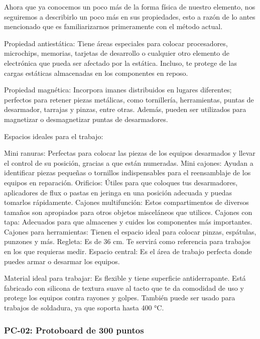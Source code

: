     Ahora que ya conocemos un poco más de la forma física de nuestro elemento, nos seguiremos a describirlo un poco más en sus propiedades, esto a razón de lo antes mencionado que es familiarizarnos primeramente con el método actual.
    
    Propiedad antiestática: Tiene áreas especiales para colocar procesadores, microchips, memorias, tarjetas de desarrollo o cualquier otro elemento de electrónica que pueda ser afectado por la estática. Incluso, te protege de las cargas estáticas almacenadas en los componentes en reposo.
    
    
    Propiedad magnética: Incorpora imanes distribuidos en lugares diferentes; perfectos para retener piezas metálicas, como tornillería, herramientas, puntas de desarmador, tarrajas y pinzas, entre otras. Además, pueden ser utilizados para magnetizar o desmagnetizar puntas de desarmadores.
    
    
    Espacios ideales para el trabajo:
    
    Mini ranuras: Perfectas para colocar las piezas de los equipos desarmados y llevar el control de su posición, gracias a que están numeradas.
    Mini cajones: Ayudan a identificar piezas pequeñas o tornillos indispensables para el reensamblaje de los equipos en reparación.
    Orificios: Útiles para que coloques tus desarmadores, aplicadores de flux o pastas en jeringa en una posición adecuada y puedas tomarlos rápidamente.
    Cajones multifunción: Estos compartimentos de diversos tamaños son apropiados para otros objetos misceláneos que utilices.
    Cajones con tapa: Adecuados para que almacenes y cuides los componentes más importantes.
    Cajones para herramientas: Tienen el espacio ideal para colocar pinzas, espátulas, punzones y más.
    Regleta: Es de 36 cm. Te servirá como referencia para trabajos en los que requieras medir.
    Espacio central: Es el área de trabajo perfecta donde puedes armar o desarmar los equipos.
    
    Material ideal para trabajar: Es flexible y tiene superficie antiderrapante. Está fabricado con silicona de textura suave al tacto que te da comodidad de uso y protege los equipos contra rayones y golpes. También puede ser usado para trabajos de soldadura, ya que soporta hasta 400 °C.
    
    
    
    \subsubsection{PC-02: Protoboard de 300 puntos}
    
